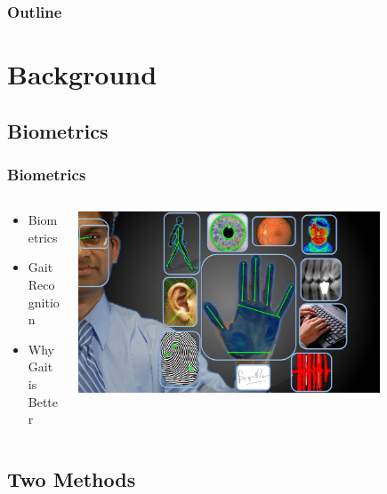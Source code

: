 \documentclass{beamer}
\begin{document}
\begin{frame}
  \frametitle{Outline}
  \tableofcontents[hideallsubsections]
\end{frame}





\section[Mobile Security]{Background}

\subsection{Biometrics}
\begin{frame}
  \frametitle{Biometrics}

  \begin{columns}
  \begin{column}{0.4\textwidth}
  \begin{itemize}
    \item Biometrics 
  	\linebreak
  	\item Gait Recognition
  	\linebreak
	\item Why Gait is Better
  \end{itemize}
  \end{column}
  \begin{column}{0.8\textwidth}
   \includegraphics[width=0.8\textwidth]{Illustrations/allbiometrics.jpg}
  \end{column}
  \end{columns}
\end{frame}

\subsection{Two Methods}
\end{document}
